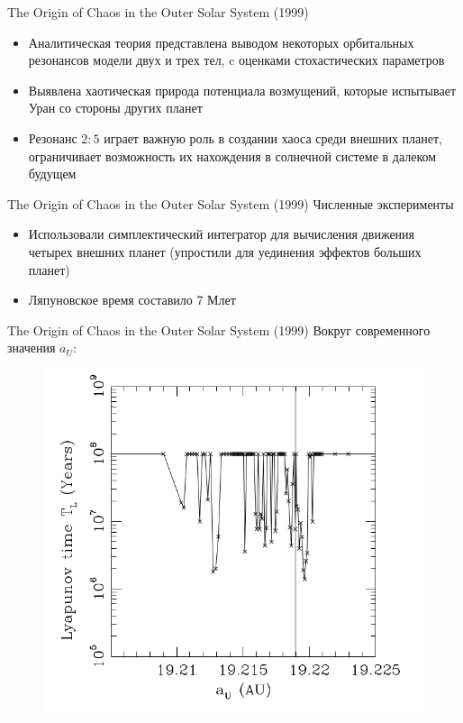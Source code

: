 \documentclass{beamer}
\begin{document}
\begin{frame}{The Origin of Chaos in the Outer Solar System (1999)}
        \begin{itemize}
                \item Аналитическая теория представлена выводом некоторых орбитальных резонансов модели двух и трех тел, c оценками стохастических параметров
                \item Выявлена хаотическая природа потенциала возмущений, которые испытывает Уран со стороны других планет
                \item Резонанс $2:5$ играет важную роль в создании хаоса среди внешних планет, ограничивает возможность их нахождения в солнечной системе в далеком будущем
        \end{itemize}
\end{frame}

\begin{frame}{The Origin of Chaos in the Outer Solar System (1999)}
        Численные эксперименты
        \begin{itemize}
                \item Использовали симплектический интегратор для вычисления движения четырех внешних планет (упростили для уединения эффектов больших планет)
                \item Ляпуновское время составило 7 Млет
        \end{itemize}
\end{frame}

\begin{frame}{The Origin of Chaos in the Outer Solar System (1999)}
        Вокруг современного значения $a_U$:
\begin{figure}[h]
\begin{minipage}[h]{0.7\linewidth}
\includegraphics[width=1\linewidth]{./au2_99.png}
\end{minipage}
\end{figure}
\end{frame}
\end{document}
